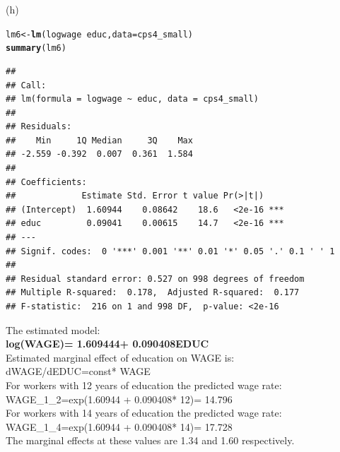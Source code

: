 \documentclass[a4paper]{article}\usepackage{graphicx, color}
\makeatletter
\newcommand{\hlfunctioncall}[1]{\textcolor[rgb]{0.501960784313725,0,0.329411764705882}{\textbf{#1}}}%
\newenvironment{kframe}{%
 \def\at@end@of@kframe{}%
 \ifinner\ifhmode%
  \def\at@end@of@kframe{\end{minipage}}%
  \begin{minipage}{\columnwidth}%
 \fi\fi%
 \def\FrameCommand##1{\hskip\@totalleftmargin \hskip-\fboxsep
 \colorbox{shadecolor}{##1}\hskip-\fboxsep
     \hskip-\linewidth \hskip-\@totalleftmargin \hskip\columnwidth}%
 \MakeFramed {\advance\hsize-\width
   \@totalleftmargin\z@ \linewidth\hsize
   \@setminipage}}%
 {\par\unskip\endMakeFramed%
 \at@end@of@kframe}
\newenvironment{knitrout}{}{} %
\makeatother
\begin{document}
(h)

\begin{knitrout}
\color{fgcolor}\begin{kframe}
\begin{alltt}
lm6 <- \hlfunctioncall{lm}(logwage ~ educ, data = cps4_small)
\hlfunctioncall{summary}(lm6)
\end{alltt}
\begin{verbatim}
## 
## Call:
## lm(formula = logwage ~ educ, data = cps4_small)
## 
## Residuals:
##    Min     1Q Median     3Q    Max 
## -2.559 -0.392  0.007  0.361  1.584 
## 
## Coefficients:
##             Estimate Std. Error t value Pr(>|t|)    
## (Intercept)  1.60944    0.08642    18.6   <2e-16 ***
## educ         0.09041    0.00615    14.7   <2e-16 ***
## ---
## Signif. codes:  0 '***' 0.001 '**' 0.01 '*' 0.05 '.' 0.1 ' ' 1
## 
## Residual standard error: 0.527 on 998 degrees of freedom
## Multiple R-squared:  0.178,	Adjusted R-squared:  0.177 
## F-statistic:  216 on 1 and 998 DF,  p-value: <2e-16
\end{verbatim}
\end{kframe}
\end{knitrout}


The estimated model:\\

\textbf{log(WAGE)= 1.609444+ 0.090408EDUC}\\

Estimated marginal effect of education on WAGE is:\\

dWAGE/dEDUC=const* WAGE\\

For workers with 12  years of education the predicted wage rate:\\

WAGE_1_2=exp(1.60944 + 0.090408* 12)= 14.796\\

For workers with 14  years of education the predicted wage rate:\\

WAGE_1_4=exp(1.60944 + 0.090408* 14)= 17.728\\

The marginal effects at these values are 1.34 and 1.60 respectively.\\
\end{document}
